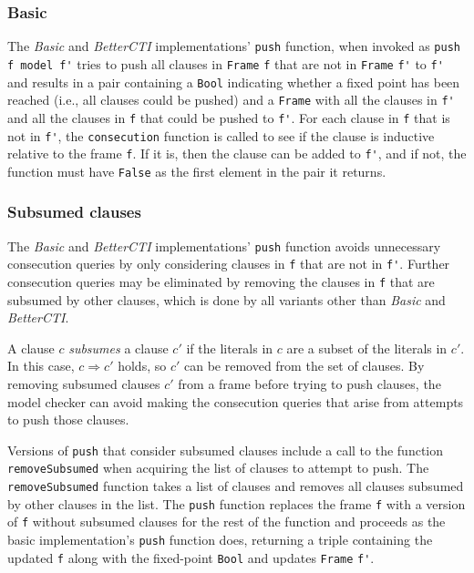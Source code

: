 \documentclass[12pt,a4paper,twoside,openright]{report}
\begin{document}
{{\subsubsection{Basic}
The {\it Basic} and {\it BetterCTI} implementations' \verb,push, function,
when invoked as \verb,push f model f', tries to push all clauses in \verb,Frame, \verb,f,
that are not in \verb,Frame, \verb,f', to \verb,f', and
results in a pair containing a \verb,Bool, indicating whether a fixed point has been reached
(i.e., all clauses could be pushed) and a \verb,Frame, with all the clauses in \verb,f', and all
the clauses in \verb,f, that could be pushed to \verb,f',.
For each clause in \verb,f, that is not in \verb,f',, the \verb,consecution, function is called to
see if the clause is inductive relative to the frame \verb,f,. If it is, then
the clause can be added to \verb,f',, and if not, the
function must have \verb,False, as the first element in the pair it returns.

\subsubsection{Subsumed clauses}
The \emph{Basic} and \emph{BetterCTI} implementations' \verb,push, function avoids unnecessary
consecution queries by only considering clauses in \verb,f, that are not in \verb,f',.
Further consecution queries may be eliminated by removing the clauses in \verb,f,
that are subsumed by other clauses, which is done by all variants other than {\it Basic}
and \emph{BetterCTI}.

A clause $c$ \emph{subsumes} a clause $c'$ if the literals in $c$ are a subset of the literals
in $c'$. In this case, $c \Rightarrow c'$ holds, so $c'$ can be removed from the set of clauses. By
removing subsumed clauses $c'$ from a frame before trying to push clauses, the model
checker can avoid making the consecution queries that arise from attempts to push those clauses.

Versions of \verb,push, that consider subsumed clauses include a call to the function
\verb,removeSubsumed, when acquiring the list of clauses to attempt to push.
The \verb,removeSubsumed, function takes a list of clauses and removes all clauses
subsumed by other clauses in the list.
The \verb,push, function replaces the frame
\verb,f, with a version of \verb,f, without subsumed clauses
for the rest of the function and proceeds as the basic implementation's \verb,push, function does,
returning a triple containing the updated \verb,f, along with the fixed-point \verb,Bool,
and updates \verb,Frame, \verb,f',.

}}
\end{document}
